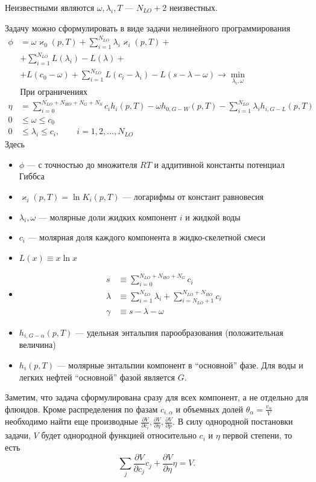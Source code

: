 \documentclass[12pt]{article}
\newcommand{\pd}[2]{\frac{\partial #1}{\partial #2}}
\begin{document}
Неизвестными являются $\omega, \lambda_i, T$ --- $N_{LO} + 2$ неизвестных.

Задачу можно сформулировать в виде задачи нелинейного программирования
\begin{align*}
\phi &= \omega \varkappa_0(p,T) + \sum_{i=1}^{N_{LO}} \lambda_i \varkappa_i(p,
T) +\\
&+ \sum_{i=1}^{N_{LO}} L(\lambda_i) - L(\lambda) + \\
&+ L(c_0 - \omega) + \sum_{i=1}^{N_{LO}} L(c_i - \lambda_i) 
- L(s - \lambda - \omega) \rightarrow \min_{\lambda_i, \omega}\\
&\text{При ограничениях}\\
\eta &= 
\sum_{i=0}^{N_{LO}+N_{HO}+N_{G}+N_{S}} c_i h_i(p,T)
-\omega h_{0,G-W}(p,T) 
-\sum_{i=1}^{N_{LO}} \lambda_i h_{i,G-L}(p,T) \\
0& \leq \omega \leq c_0\\
0& \leq \lambda_i \leq c_i, \qquad i = 1,2,\dots,N_{LO}
\end{align*}
Здесь
\begin{itemize}
\item $\phi$ --- с точностью до множителя $RT$ и аддитивной константы потенциал
Гиббса
\item $\varkappa_i(p, T) = \ln K_i(p, T)$ --- логарифмы от констант
равновесия
\item $\lambda_i, \omega$ --- молярные доли жидких
компонент $i$ и жидкой воды
\item $c_i$ --- молярная доля каждого компонента в
жидко-скелетной смеси
\item $L(x) \equiv x \ln x$
\item \begin{align*}
s &\equiv \sum_{i=0}^{N_{LO}+N_{HO}+N_{G}} c_i\\
\lambda &\equiv \sum_{i=1}^{N_{LO}} \lambda_i + \sum_{i = N_{LO} +
1}^{N_{LO}+N_{HO}}c_i\\
\gamma &\equiv s - \lambda - \omega
\end{align*}
\item $h_{i,G-\alpha}(p,T)$ --- удельная энтальпия парообразования
(положительная величина)
\item $h_i(p,T)$ --- молярные энтальпии компонент в ``основной'' фазе. Для воды
и легких нефтей ``основной'' фазой является $G$.
\end{itemize}

Заметим, что задача сформулирована сразу для всех компонент, а не отдельно для
флюидов. Кроме распределения по фазам $c_{i,\alpha}$
и объемных долей $\theta_\alpha = \frac{v_\alpha}{V}$ необходимо найти еще
производные $\pd{V}{c_i}, \pd{V}{\eta}, \pd{V}{p}$. В силу однородной постановки
задачи, $V$ будет однородной функцией относительно $c_i$ и $\eta$ первой степени, то есть
\[\sum_j \pd{V}{c_j}c_j + \pd{V}{\eta}\eta = V.\]
\end{document}

